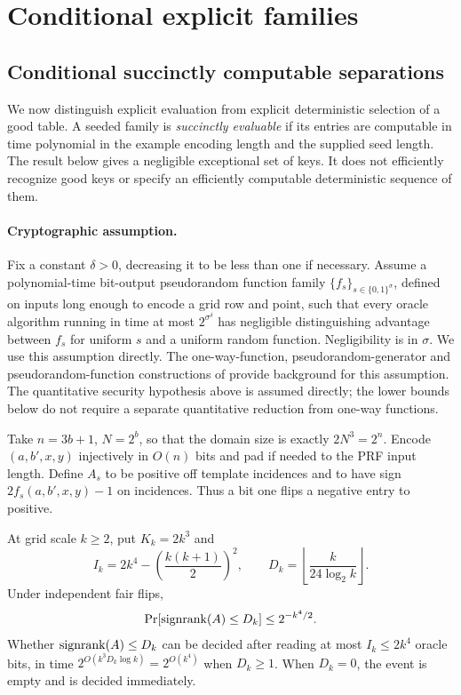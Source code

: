 \section{Conditional explicit families}\label{sec:explicit}
\subsection{Conditional succinctly computable separations}\label{sec:prf}
We now distinguish explicit evaluation from explicit deterministic selection of a good table. A seeded family is \emph{succinctly evaluable} if its entries are computable in time polynomial in the example encoding length and the supplied seed length. The result below gives a negligible exceptional set of keys. It does not efficiently recognize good keys or specify an efficiently computable deterministic sequence of them.

\paragraph{Cryptographic assumption.}
Fix a constant $\delta>0$, decreasing it to be less than one if necessary. Assume a polynomial-time bit-output pseudorandom function family $\{f_s\}_{s\in\{0,1\}^\sigma}$, defined on inputs long enough to encode a grid row and point, such that every oracle algorithm running in time at most $2^{\sigma^\delta}$ has negligible distinguishing advantage between $f_s$ for uniform $s$ and a uniform random function. Negligibility is in $\sigma$. We use this assumption directly. The one-way-function, pseudorandom-generator and pseudorandom-function constructions of \citet{HILL99,GGM86} provide background for this assumption. The quantitative security hypothesis above is assumed directly; the lower bounds below do not require a separate quantitative reduction from one-way functions.

Take $n=3b+1$, $N=2^b$, so that the domain size is exactly $2N^3=2^n$. Encode $(a,b',x,y)$ injectively in $O(n)$ bits and pad if needed to the PRF input length. Define $A_s$ to be positive off template incidences and to have sign $2f_s(a,b',x,y)-1$ on incidences. Thus a bit one flips a negative entry to positive.


\begin{lemma}\label{lem:subgrid}
At grid scale $k\ge2$, put $K_k=2k^3$ and
\[
 I_k=2k^4-\left(\frac{k(k+1)}2\right)^2,
 \qquad D_k=\left\lfloor\frac{k}{24\log_2 k}\right\rfloor.
\]
Under independent fair flips,
\[
 \Pr[\operatorname{signrank}(A)\le D_k]\le2^{-k^4/2}.
\]
Whether $\operatorname{signrank}(A)\le D_k$ can be decided after reading at most $I_k\le2k^4$ oracle bits, in time $2^{O(k^3D_k\log k)}=2^{O(k^4)}$ when $D_k\ge1$. When $D_k=0$, the event is empty and is decided immediately.
\end{lemma}

